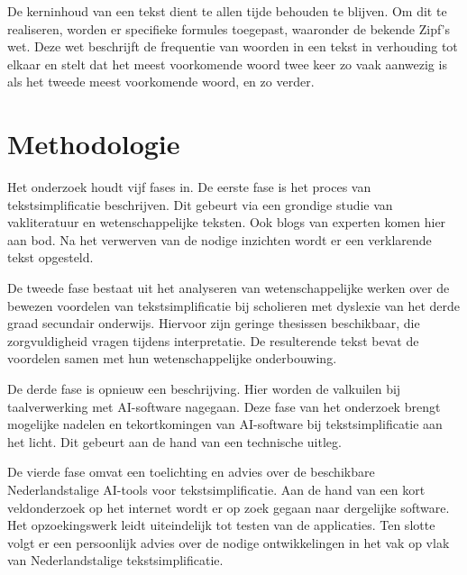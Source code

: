 De kerninhoud van een tekst dient te allen tijde behouden te blijven. Om dit te realiseren, worden er specifieke formules toegepast, waaronder de bekende Zipf's wet. Deze wet beschrijft de frequentie van woorden in een tekst in verhouding tot elkaar en stelt dat het meest voorkomende woord twee keer zo vaak aanwezig is als het tweede meest voorkomende woord, en zo verder.





\section{Methodologie}%
\label{sec:methodologie}

Het onderzoek houdt vijf fases in. De eerste fase is het proces van tekstsimplificatie beschrijven. Dit gebeurt via een grondige studie van vakliteratuur en wetenschappelijke teksten. Ook blogs van experten komen hier aan bod. Na het verwerven van de nodige inzichten wordt er een verklarende tekst opgesteld.

De tweede fase bestaat uit het analyseren van wetenschappelijke werken over de bewezen voordelen van tekstsimplificatie bij scholieren met dyslexie van het derde graad secundair onderwijs. Hiervoor zijn geringe thesissen beschikbaar, die zorgvuldigheid vragen tijdens interpretatie. De resulterende tekst bevat de voordelen samen met hun wetenschappelijke onderbouwing.

De derde fase is opnieuw een beschrijving. Hier worden de valkuilen bij taalverwerking met AI-software nagegaan. Deze fase van het onderzoek brengt mogelijke nadelen en tekortkomingen van AI-software bij tekstsimplificatie aan het licht. Dit gebeurt aan de hand van een technische uitleg.

De vierde fase omvat een toelichting en advies over de beschikbare Nederlandstalige AI-tools voor tekstsimplificatie. Aan de hand van een kort veldonderzoek op het internet wordt er op zoek gegaan naar dergelijke software. Het opzoekingswerk leidt uiteindelijk tot testen van de applicaties. Ten slotte volgt er een persoonlijk advies over de nodige ontwikkelingen in het vak op vlak van Nederlandstalige tekstsimplificatie.

